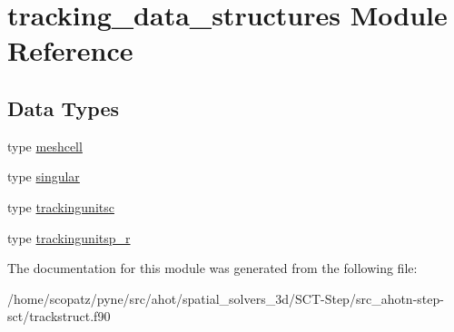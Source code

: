 \hypertarget{classtracking__data__structures}{\section{tracking\-\_\-data\-\_\-structures Module Reference}
\label{classtracking__data__structures}
}
\subsection*{Data Types}
\begin{DoxyCompactItemize}
\item 
type \hyperlink{structtracking__data__structures_1_1meshcell}{meshcell}
\item 
type \hyperlink{structtracking__data__structures_1_1singular}{singular}
\item 
type \hyperlink{structtracking__data__structures_1_1trackingunitsc}{trackingunitsc}
\item 
type \hyperlink{structtracking__data__structures_1_1trackingunitsp__r}{trackingunitsp\-\_\-r}
\end{DoxyCompactItemize}


The documentation for this module was generated from the following file\-:\begin{DoxyCompactItemize}
\item 
/home/scopatz/pyne/src/ahot/spatial\-\_\-solvers\-\_\-3d/\-S\-C\-T-\/\-Step/src\-\_\-ahotn-\/step-\/sct/trackstruct.\-f90\end{DoxyCompactItemize}
